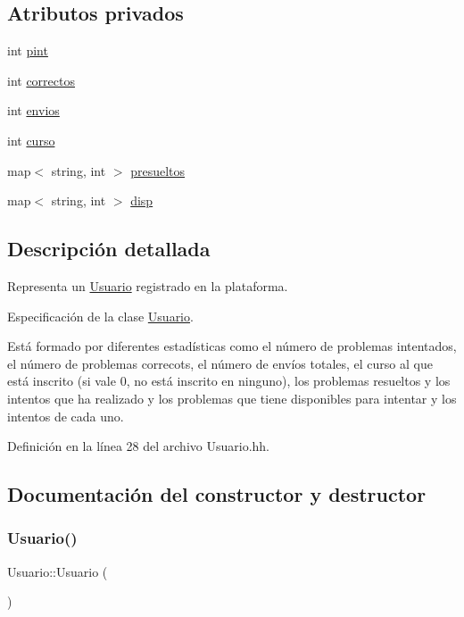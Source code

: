 \subsection*{Atributos privados}
\begin{DoxyCompactItemize}
\item 
int \mbox{\hyperlink{class_usuario_adff16a149798e94b0747e7dc1bd85107}{pint}}
\item 
int \mbox{\hyperlink{class_usuario_a6d7fd52e0625b61d324922bf4783435e}{correctos}}
\item 
int \mbox{\hyperlink{class_usuario_a485a741c0646e6414bd6cf669a77fc9c}{envios}}
\item 
int \mbox{\hyperlink{class_usuario_aa767fe2d1198f2c97791073bc55803e7}{curso}}
\item 
map$<$ string, int $>$ \mbox{\hyperlink{class_usuario_ae614e565ce48a314a1e2b05beee8567b}{presueltos}}
\item 
map$<$ string, int $>$ \mbox{\hyperlink{class_usuario_a4402178ca5b057733c675e3849718e96}{disp}}
\end{DoxyCompactItemize}


\subsection{Descripción detallada}
Representa un \mbox{\hyperlink{class_usuario}{Usuario}} registrado en la plataforma. 

Especificación de la clase \mbox{\hyperlink{class_usuario}{Usuario}}.

Está formado por diferentes estadísticas como el número de problemas intentados, el número de problemas correcots, el número de envíos totales, el curso al que está inscrito (si vale 0, no está inscrito en ninguno), los problemas resueltos y los intentos que ha realizado y los problemas que tiene disponibles para intentar y los intentos de cada uno. 

Definición en la línea 28 del archivo Usuario.\+hh.



\subsection{Documentación del constructor y destructor}
\mbox{\label{class_usuario_aa85a5371a098dfba5449140d9b8a472f}} 
\subsubsection{\texorpdfstring{Usuario()}{Usuario()}}
{\footnotesize\ttfamily Usuario\+::\+Usuario (\begin{DoxyParamCaption}{ }\end{DoxyParamCaption})}



